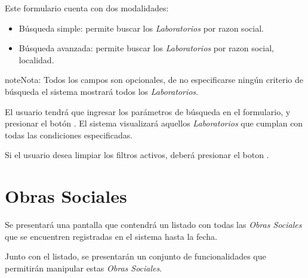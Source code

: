 \documentclass[a4paper,10pt,spanish]{sphinxmanual}
\begin{document}

Este formulario cuenta con dos modalidades:
\begin{itemize}
\item {} 
Búsqueda simple: permite buscar los \emph{Laboratorios} por razon social.

\item {} 
Búsqueda avanzada: permite buscar los \emph{Laboratorios} por razon social, localidad.

\end{itemize}

\begin{notice}{note}{Nota:}
Todos los campos son opcionales, de no especificarse ningún criterio de búsqueda el sistema mostrará todos los \emph{Laboratorios}.
\end{notice}

El usuario tendrá que ingresar los parámetros de búsqueda en el formulario, y presionar el botón . El sistema visualizará aquellos \emph{Laboratorios} que cumplan con todas las condiciones especificadas.

Si el usuario desea limpiar los filtros activos, deberá presionar el boton .



\section{Obras Sociales}
\label{obrassociales::doc}\label{obrassociales:obras-sociales}
Se presentará una pantalla que contendrá un listado con todas las \emph{Obras Sociales} que se encuentren registradas en el sistema hasta la fecha.


Junto con el listado, se presentarán un conjunto de funcionalidades que permitirán manipular estas \emph{Obras Sociales}.
\end{document}

